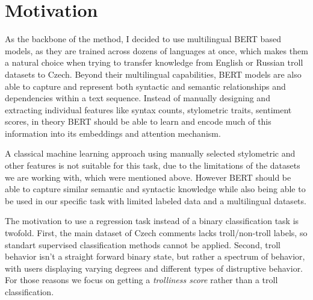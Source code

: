 \documentclass[twoside]{ctuthesis}
\theoremstyle{plain}
\theoremstyle{definition}
\theoremstyle{note}
\begin{document}
\section{Motivation}
As the backbone of the method, I decided to use multilingual BERT based models, as they are trained across dozens of languages at once, which makes them a natural choice when trying to transfer knowledge from English or Russian troll datasets to Czech. Beyond their multilingual capabilities, BERT models are also able to capture and represent both syntactic and semantic relationships and dependencies within a text sequence. Instead of manually designing and extracting individual features like syntax counts, stylometric traits, sentiment scores, in theory BERT should be able to learn and encode much of this information into its embeddings and attention mechanism\cite{Rogers2020}.\par
A classical machine learning approach using manually selected stylometric and other features is not suitable for this task, due to the limitations of the datasets we are working with, which were mentioned above. However BERT should be able to capture similar semantic and syntactic knowledge while also being able to be used in our specific task with limited labeled data and a multilingual datasets.\par
The motivation to use a regression task instead of a binary classification task is twofold. First, the main dataset of Czech comments lacks troll/non-troll labels, so standart supervised classification methods cannot be applied. Second, troll behavior isn't a straight forward binary state, but rather a spectrum of behavior, with users displaying varying degrees and different types of distruptive behavior. For those reasons we focus on getting a \textit{trolliness score} rather than a troll classification.\par
\end{document}
